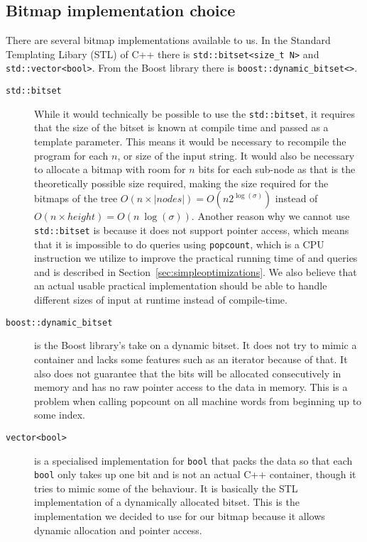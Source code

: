 \subsection{Bitmap implementation choice}
There are several bitmap implementations available to us. In the Standard Templating Libary (STL) of C++ there is \texttt{std::bitset<size\_t N>} and \texttt{std::vector<bool>}. From the Boost library there is \texttt{boost::dynamic\_bitset<>}.
\begin{description}
\item[\texttt{std::bitset}] While it would technically be possible to use the \texttt{std::bitset}, it requires that the size of the bitset is known at compile time and passed as a template parameter. This means it would be necessary to recompile the program for each $n$, or size of the input string. 
It would also be necessary to allocate a bitmap with room for $n$ bits for each sub-node as that is the theoretically possible size required, making the size required for the bitmaps of the tree $O(n \times |nodes|) = O(n2^{\log(\sigma)})$ instead of $O(n \times height) = O(n~\log(\sigma))$.
Another reason why we cannot use \texttt{std::bitset} is because it does not support pointer access, which means that it is impossible to do queries using \texttt{popcount}, which is a CPU instruction we utilize to improve the practical running time of  and  queries and is described in Section~\ref{sec:simpleoptimizations}.
We also believe that an actual usable practical implementation should be able to handle different sizes of input at runtime instead of compile-time. 

\item[\texttt{boost::dynamic\_bitset}] is the Boost library's take on a dynamic bitset. 
It does not try to mimic a container and lacks some features such as an iterator because of that. 
It also does not guarantee that the bits will be allocated consecutively in memory and has no raw pointer access to the data in memory. 
This is a problem when calling popcount on all machine words from beginning up to some index.

\item[\texttt{vector<bool>}] is a specialised implementation for \texttt{bool} that packs the data so that each \texttt{bool} only takes up one bit and is not an actual C++ container, though it tries to mimic some of the behaviour. 
It is basically the STL implementation of a dynamically allocated bitset. This is the implementation we decided to use for our bitmap because it allows dynamic allocation and pointer access.
\end{description}

